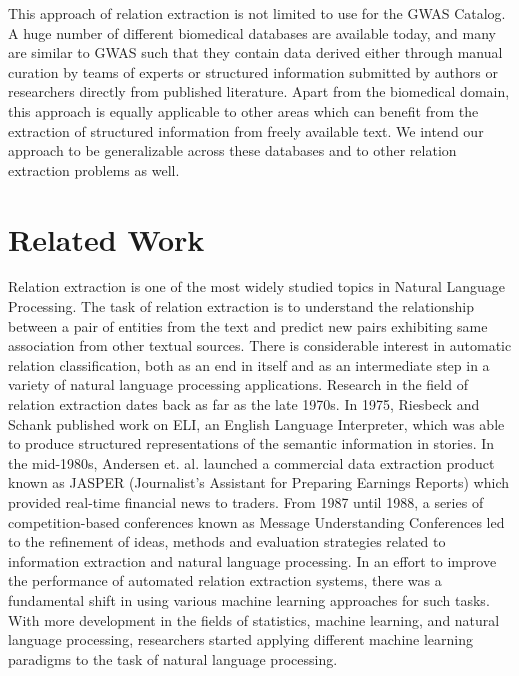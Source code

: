 This approach of relation extraction is not limited to use for the GWAS Catalog. A huge number of different biomedical databases are available today, and many are similar to GWAS such that they contain data derived either through manual curation by teams of experts or structured information submitted by authors or researchers directly from published literature. Apart from the biomedical domain, this approach is equally applicable to other areas which can benefit from the extraction of structured information from freely available text. We intend our approach to be generalizable across these databases and to other relation extraction problems as well. 

\section{Related Work}
\label{section:related-work}
Relation extraction is one of the most widely studied topics in Natural Language Processing. The task of relation extraction is to understand the relationship between a pair of entities from the text and predict new pairs exhibiting same association from other textual sources. There is considerable interest in automatic relation classification, both as an end in itself and as an intermediate step in a variety of natural language processing applications. 
Research in the field of relation extraction dates back as far as the late 1970s. In 1975, Riesbeck and Schank \cite{riesbeck1976comprehension} published work on ELI, an English Language Interpreter, which was able to produce structured representations of the semantic information in stories. In the mid-1980s, Andersen et. al. \cite {andersen1992automatic} launched a commercial data extraction product known as JASPER (Journalist's Assistant for Preparing Earnings Reports) which provided real-time financial news to traders. From 1987 until 1988, a series of competition-based conferences known as Message Understanding Conferences \cite{grishman1996message} led to the refinement of ideas, methods and evaluation strategies related to information extraction and natural language processing. In an effort to improve the performance of automated relation extraction systems, there was a fundamental shift in using various machine learning approaches for such tasks. With more development in the fields of statistics, machine learning, and natural language processing, researchers started applying different machine learning paradigms to the task of natural language processing.  

